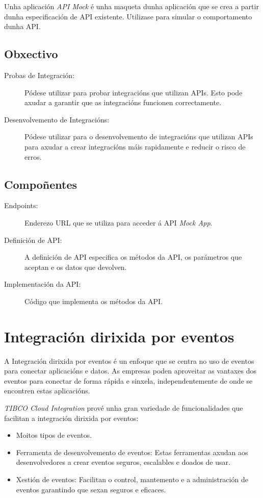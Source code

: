 Unha aplicación \textit{API Mock} é unha maqueta dunha aplicación que se crea a partir dunha especificación de API existente. Utilizase para simular o comportamento dunha API. 

\subsection{Obxectivo}

\begin{description}
    \item[Probas de Integración:] Pódese utilizar para probar integracións que utilizan APIs. Esto pode axudar a garantir que as integracións funcionen correctamente.
    \item[Desenvolvemento de Integracións:] Pódese utilizar para o desenvolvemento de integracións que utilizan APIs para axudar a crear integracións máis rapidamente e reducir o risco de erros.
\end{description}

\subsection{Compoñentes}

\begin{description}
    \item[Endpoints:] Enderezo URL que se utiliza para acceder á API \textit{Mock App}.
    \item[Definición de API:] A definición de API especifica os métodos da API, os parámetros que aceptan e os datos que devolven.
    \item[Implementación da API:] Código que implementa os métodos da API.
\end{description}

\section{Integración dirixida por eventos}

A Integración dirixida por eventos é un enfoque que se centra no uso de eventos para conectar aplicacións e datos. As empresas poden aproveitar as vantaxes dos eventos para conectar de forma rápida e sinxela, independentemente de onde se encontren estas aplicacións.

\textit{TIBCO Cloud Integration} prové unha gran variedade de funcionalidades que facilitan a integración dirixida por eventos:

\begin{itemize}
    \item Moitos tipos de eventos.
    \item Ferramenta de desenvolvemento de eventos: Estas ferramentas axudan aos desenvolvedores a crear eventos seguros, escalables e doados de usar.
    \item Xestión de eventos: Facilitan o control, mantemento e a administración de eventos garantindo que sexan seguros e eficaces.
\end{itemize}

